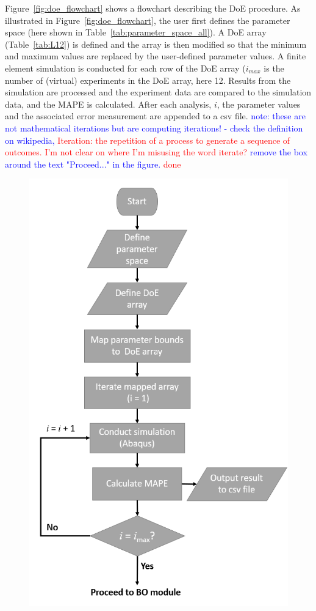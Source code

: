 \documentclass[preprint, review, 12pt]{elsarticle}
\begin{document}
{	Figure~\ref{fig:doe_flowchart} shows a flowchart describing the DoE procedure.
	As illustrated in Figure~\ref{fig:doe_flowchart}, the user first defines the parameter space (here shown in Table~\ref{tab:parameter_space_all}).
	A DoE array (Table~\ref{tab:L12}) is defined and the array is then modified so that the minimum and maximum values are replaced by the user-defined parameter values.
	A finite element simulation is conducted for each row of the DoE array ($i_{max}$ is the number of (virtual) experiments in the DoE array, here 12.
	Results from the simulation are processed and the experiment data are compared to the simulation data, and the MAPE is calculated.
	After each analysis, $i$, the parameter values and the associated error measurement are appended to a csv file.
	\textcolor{blue}{note: these are not mathematical iterations but are computing iterations! - check the definition on wikipedia, }
	\textcolor{red}{Iteration: the repetition of a process to generate a sequence of outcomes. I'm not clear on where I'm misusing the word iterate?}
	\textcolor{blue}{remove the box around the text "Proceed..." in the figure.}
	\textcolor{red}{done}
	\begin{figure}[!htbp]
		\centering
		\includegraphics[width=\linewidth, height=0.8\textheight, keepaspectratio]{DOE_FLOWCHART}

\end{figure}}
\end{document}
